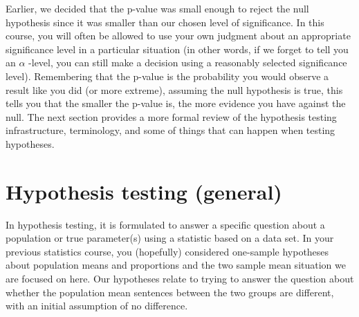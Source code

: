 \documentclass[]{book}
\begin{document}
Earlier, we decided that the p-value was small enough to reject the null
hypothesis since it was smaller than our chosen level of significance.
In this course, you will often be allowed to use your own judgment about
an appropriate significance level in a particular situation (in other
words, if we forget to tell you an \(\alpha\) -level, you can still make
a decision using a reasonably selected significance level). Remembering
that the p-value is the probability you would observe a result like you
did (or more extreme), assuming the null hypothesis is true, this tells
you that the smaller the p-value is, the more evidence you have against
the null. The next section provides a more formal review of the
hypothesis testing infrastructure, terminology, and some of things that
can happen when testing hypotheses.

\section{Hypothesis testing (general)}\label{section2-5}

In hypothesis testing, it is formulated to answer a specific question
about a population or true parameter(s) using a statistic based on a
data set. In your previous statistics course, you (hopefully) considered
one-sample hypotheses about population means and proportions and the two
sample mean situation we are focused on here. Our hypotheses relate to
trying to answer the question about whether the population mean
sentences between the two groups are different, with an initial
assumption of no difference.
\end{document}
